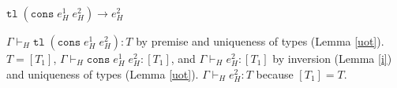 \begin{case}
$\mathtt{tl}\;(\mathtt{cons}\;e_{H}^{1}\;e_{H}^{2})\rightarrow e_{H}^{2}$

$\Gamma\vdash_{H}\mathtt{tl}\;(\mathtt{cons}\;e_{H}^{1}\;e_{H}^{2}):T$ by premise and uniqueness of types (Lemma \ref{uot}).  $T=[T_{1}]$, $\Gamma\vdash_{H}\mathtt{cons}\;e_{H}^{1}\;e_{H}^{2}:[T_{1}]$, and $\Gamma\vdash_{H}e_{H}^{2}:[T_{1}]$ by inversion (Lemma \ref{i}) and uniqueness of types (Lemma \ref{uot}).  $\Gamma\vdash_{H}e_{H}^{2}:T$ because $[T_{1}]=T$.
\end{case}